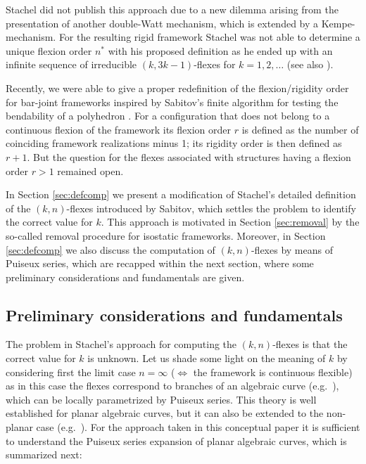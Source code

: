 \documentclass{svproc}
\begin{document}
Stachel did not publish this approach due to a new dilemma arising from the presentation \cite{stachel_aim} of another double-Watt mechanism, 
which is extended by a Kempe-mechanism. 
For the resulting rigid framework Stachel was not able to determine a unique flexion order $n^*$ with his proposed definition as he ended up with an infinite sequence of irreducible $(k,3k-1)$-flexes  
for $k=1,2,\ldots$ (see also \cite[Ex.\ 3]{MMT}). %

Recently, we were able to give a proper redefinition of the flexion/rigidity order 
for bar-joint frameworks  \cite[Defs.\ 3 and 4]{MMT} inspired by Sabitov's finite algorithm for testing the bendability of a polyhedron \cite{sabitov}. For a configuration that does not belong to a continuous flexion of the framework its flexion order $r$ is defined as the number of coinciding framework realizations minus 1; its rigidity order is then defined as  $r+1$. 
But the question for the flexes associated with structures having a flexion order $r>1$ remained open.




In Section \ref{sec:defcomp} we present a modification of Stachel's detailed definition of the $(k,n)$-flexes introduced by Sabitov, which settles the problem to identify the correct value for $k$. This approach is motivated in Section \ref{sec:removal} by the so-called removal procedure for isostatic frameworks. Moreover, in Section \ref{sec:defcomp} we also discuss the computation of $(k,n)$-flexes by means of Puiseux series, which are recapped within the next section, where some preliminary considerations and fundamentals are given.




\subsection{Preliminary considerations and fundamentals}\label{sec:pcf}

The problem in Stachel's approach for computing the $(k,n)$-flexes is that the correct value for $k$ is unknown. Let us shade some light on the meaning of $k$ by considering first the limit case $n=\infty$  ($\Leftrightarrow$ the framework is continuous flexible) as in this case the flexes correspond to branches of an 
algebraic curve (e.g.\ \cite{burau,semple,walker}), 
which can be locally parametrized by Puiseux series. This theory is well established for planar algebraic curves,  
but it can 
also be extended to the non-planar case (e.g.\ \cite{alonso,jensen,maurer}). 
For the approach taken in this conceptual paper it is sufficient to understand the Puiseux series expansion of planar algebraic curves, which is summarized next: 
\end{document}
